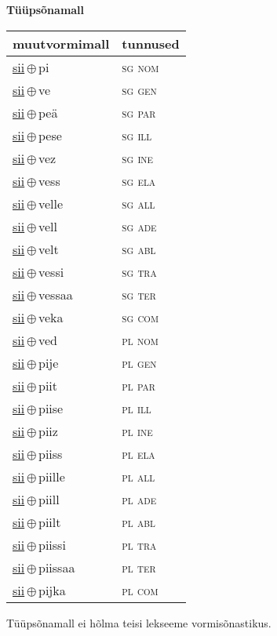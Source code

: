 

\vspace{3.5em}
\noindent \begin{minipage}{\textwidth}
\noindent \textbf{Tüüpsõnamall \,}\\

\begin{sideways}
\begin{tabular}{l l}
muutvormimall & tunnused \\
\hline
\underline{sii}\,$\oplus$\,pi & \textsc{ sg nom } \\
\underline{sii}\,$\oplus$\,ve & \textsc{ sg gen } \\
\underline{sii}\,$\oplus$\,peä & \textsc{ sg par } \\
\underline{sii}\,$\oplus$\,pese & \textsc{ sg ill } \\
\underline{sii}\,$\oplus$\,vez & \textsc{ sg ine } \\
\underline{sii}\,$\oplus$\,vess & \textsc{ sg ela } \\
\underline{sii}\,$\oplus$\,velle & \textsc{ sg all } \\
\underline{sii}\,$\oplus$\,vell & \textsc{ sg ade } \\
\underline{sii}\,$\oplus$\,velt & \textsc{ sg abl } \\
\underline{sii}\,$\oplus$\,vessi & \textsc{ sg tra } \\
\underline{sii}\,$\oplus$\,vessaa & \textsc{ sg ter } \\
\underline{sii}\,$\oplus$\,veka & \textsc{ sg com } \\
\underline{sii}\,$\oplus$\,ved & \textsc{ pl nom } \\
\underline{sii}\,$\oplus$\,pije & \textsc{ pl gen } \\
\underline{sii}\,$\oplus$\,piit & \textsc{ pl par } \\
\underline{sii}\,$\oplus$\,piise & \textsc{ pl ill } \\
\underline{sii}\,$\oplus$\,piiz & \textsc{ pl ine } \\
\underline{sii}\,$\oplus$\,piiss & \textsc{ pl ela } \\
\underline{sii}\,$\oplus$\,piille & \textsc{ pl all } \\
\underline{sii}\,$\oplus$\,piill & \textsc{ pl ade } \\
\underline{sii}\,$\oplus$\,piilt & \textsc{ pl abl } \\
\underline{sii}\,$\oplus$\,piissi & \textsc{ pl tra } \\
\underline{sii}\,$\oplus$\,piissaa & \textsc{ pl ter } \\
\underline{sii}\,$\oplus$\,pijka & \textsc{ pl com } \\
\end{tabular}
\end{sideways}
\label{tab:tüüpsõnamall-siipi}

\end{minipage}

 
\vspace{1em}
\noindent Tüüpsõnamall  ei hõlma teisi lekseeme vormi\-sõnastikus.
